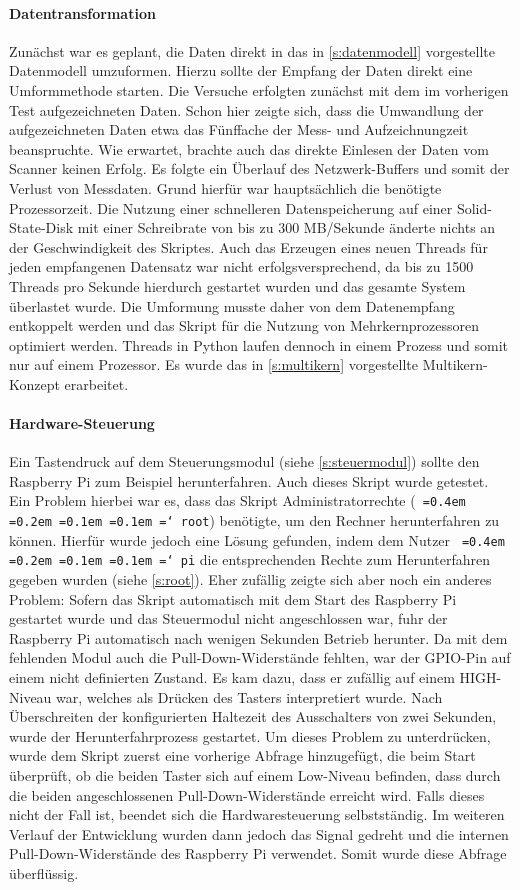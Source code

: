 \documentclass[a4paper,12pt,bibliography=totoc, listof=totoc,titlepage,pointlessnumbers]{scrreprt}
\newcommand*\justify{%
  \fontdimen2\font=0.4em%
  \fontdimen3\font=0.2em%
  \fontdimen4\font=0.1em%
  \fontdimen7\font=0.1em%
  \hyphenchar\font=`\-%
}
\newcommand{\code}[1]{\texttt{\justify{#1}}}
\begin{document}
\paragraph{Datentransformation}
Zunächst war es geplant, die Daten direkt in das in \autoref{s:datenmodell} vorgestellte Datenmodell umzuformen. Hierzu sollte der Empfang der Daten direkt eine Umformmethode starten. Die Versuche erfolgten zunächst mit dem im vorherigen Test aufgezeichneten Daten. Schon hier zeigte sich, dass die Umwandlung der aufgezeichneten Daten etwa das Fünffache der Mess- und Aufzeichnungzeit beanspruchte. Wie erwartet, brachte auch das direkte Einlesen der Daten vom Scanner keinen Erfolg. Es folgte ein Überlauf des Netzwerk-Buffers und somit der Verlust von Messdaten. Grund hierfür war hauptsächlich die benötigte Prozessorzeit. Die Nutzung einer schnelleren Datenspeicherung auf einer Solid-State-Disk mit einer Schreibrate von bis zu 300 MB/Sekunde änderte nichts an der Geschwindigkeit des Skriptes. Auch das Erzeugen eines neuen Threads für jeden empfangenen Datensatz war nicht erfolgsversprechend, da bis zu 1500 Threads pro Sekunde hierdurch gestartet wurden und das gesamte System überlastet wurde. Die Umformung musste daher von dem Datenempfang entkoppelt werden und das Skript für die Nutzung von Mehrkernprozessoren optimiert werden. Threads in Python laufen dennoch in einem Prozess und somit nur auf einem Prozessor. Es wurde das in \autoref{s:multikern} vorgestellte Multikern-Konzept erarbeitet.

\paragraph{Hardware-Steuerung}
Ein Tastendruck auf dem Steuerungsmodul (siehe \autoref{s:steuermodul}) sollte den Raspberry Pi zum Beispiel herunterfahren. Auch dieses Skript wurde getestet. Ein Problem hierbei war es, dass das Skript Administratorrechte (\code{root}) benötigte, um den Rechner herunterfahren zu können. Hierfür wurde jedoch eine Lösung gefunden, indem dem Nutzer \code{pi} die entsprechenden Rechte zum Herunterfahren gegeben wurden (siehe \autoref{s:root}). Eher zufällig zeigte sich aber noch ein anderes Problem: Sofern das Skript automatisch mit dem Start des Raspberry Pi gestartet wurde und das Steuermodul nicht angeschlossen war, fuhr der Raspberry Pi automatisch nach wenigen Sekunden Betrieb herunter. Da mit dem fehlenden Modul auch die Pull-Down-Widerstände fehlten, war der GPIO-Pin auf einem nicht definierten Zustand. Es kam dazu, dass er zufällig auf einem HIGH-Niveau war, welches als Drücken des Tasters interpretiert wurde. Nach Überschreiten der konfigurierten Haltezeit des Ausschalters von zwei Sekunden, wurde der Herunterfahrprozess gestartet. Um dieses Problem zu unterdrücken, wurde dem Skript zuerst eine vorherige Abfrage hinzugefügt, die beim Start überprüft, ob die beiden Taster sich auf einem Low-Niveau befinden, dass durch die beiden angeschlossenen Pull-Down-Widerstände erreicht wird. Falls dieses nicht der Fall ist, beendet sich die Hardwaresteuerung selbst\-stän\-dig. Im weiteren Verlauf der Entwicklung wurden dann jedoch das Signal gedreht und die internen Pull-Down-Widerstände des Raspberry Pi verwendet. Somit wurde diese Abfrage überflüssig.
\end{document}

